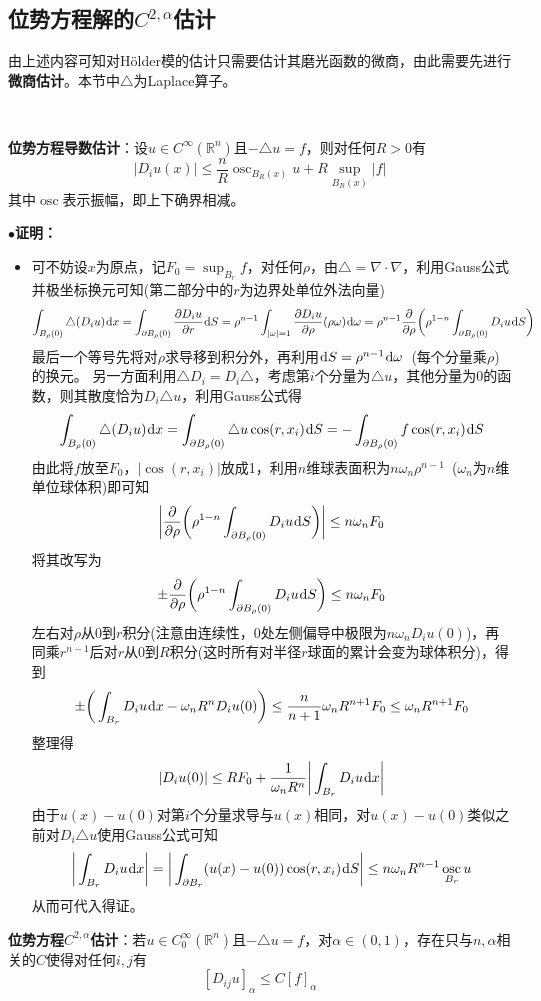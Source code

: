 \documentclass[a4paper,UTF8,fontset=windows,AutoFakeBold]{ctexart}
\newcommand*{\dr}{\hspace{0.07em}\mathrm{d}}
\DeclareMathOperator*{\osc}{osc}
\newcommand{\proo}[1]{{\kaishu $\bullet$\textbf{证明：}
\begin{itemize}
    \item[] #1
\end{itemize}
}}
\begin{document}
\subsection{位势方程解的$C^{2,\alpha}$估计}
由上述内容可知对H\"older模的估计只需要估计其磨光函数的微商，由此需要先进行\textbf{微商估计}。本节中$\triangle$为Laplace算子。

\

\textbf{位势方程导数估计}：设$u\in C^\infty(\mathbb{R}^n)$且$-\triangle u=f$，则对任何$R>0$有
$$|D_iu(x)|\le\frac{n}{R}\osc_{B_R(x)}u+R\sup_{B_R(x)}|f|$$
其中$\osc$表示振幅，即上下确界相减。

\proo{
    可不妨设$x$为原点，记$F_0=\sup_{B_r}f$，对任何$\rho$，由$\triangle=\nabla\cdot\nabla$，利用Gauss公式并极坐标换元可知(第二部分中的$r$为边界处单位外法向量)
    $$\int_{B_\rho(0)}\triangle(D_iu)\dr x=\int_{\partial B_\rho(0)}\frac{\partial D_iu}{\partial r}\dr S=\rho^{n-1}\int_{|\omega|=1}\frac{\partial D_iu}{\partial\rho}(\rho\omega)\dr\omega=\rho^{n-1}\frac{\partial}{\partial\rho}\bigg(\rho^{1-n}\int_{\partial B_\rho(0)}D_iu\dr S\bigg)$$
    最后一个等号先将对$\rho$求导移到积分外，再利用$\dr S=\rho^{n-1}\dr\omega$\ (每个分量乘$\rho$)的换元。
    另一方面利用$\triangle D_i=D_i\triangle$，考虑第$i$个分量为$\triangle u$，其他分量为0的函数，则其散度恰为$D_i\triangle u$，利用Gauss公式得
    $$\int_{B_\rho(0)}\triangle(D_iu)\dr x=\int_{\partial B_\rho(0)}\triangle u\cos(r,x_i)\dr S=-\int_{\partial B_\rho(0)}f\cos(r,x_i)\dr S$$
    由此将$f$放至$F_0$，$|\cos(r,x_i)|$放成1，利用$n$维球表面积为$n\omega_n\rho^{n-1}$\ ($\omega_n$为$n$维单位球体积)即可知
    $$\bigg|\frac{\partial}{\partial\rho}\bigg(\rho^{1-n}\int_{\partial B_\rho(0)}D_iu\dr S\bigg)\bigg|\le n\omega_n F_0$$
    将其改写为
    $$\pm\frac{\partial}{\partial\rho}\bigg(\rho^{1-n}\int_{\partial B_\rho(0)}D_iu\dr S\bigg)\le n\omega_n F_0$$
    左右对$\rho$从0到$r$积分(注意由连续性，0处左侧偏导中极限为$n\omega_nD_iu(0)$)，再同乘$r^{n-1}$后对$r$从0到$R$积分(这时所有对半径$r$球面的累计会变为球体积分)，得到
    $$\pm\bigg(\int_{B_r}D_iu\dr x-\omega_nR^nD_iu(0)\bigg)\le\frac{n}{n+1}\omega_nR^{n+1}F_0\le\omega_nR^{n+1}F_0$$
    整理得
    $$|D_iu(0)|\le RF_0+\frac{1}{\omega_nR^n}\bigg|\int_{B_r}D_iu\dr x\bigg|$$
    由于$u(x)-u(0)$对第$i$个分量求导与$u(x)$相同，对$u(x)-u(0)$类似之前对$D_i\triangle u$使用Gauss公式可知
    $$\bigg|\int_{B_r}D_iu\dr x\bigg|=\bigg|\int_{\partial B_r}(u(x)-u(0))\cos(r,x_i)\dr S\bigg|\le n\omega_nR^{n-1}\osc_{B_r}u$$
    从而可代入得证。
}

\textbf{位势方程$C^{2,\alpha}$估计}：若$u\in C_0^\infty(\mathbb{R}^n)$且$-\triangle u=f$，对$\alpha\in(0,1)$，存在只与$n,\alpha$相关的$C$使得对任何$i,j$有
$$[D_{ij}u]_\alpha\le C[f]_\alpha$$
\end{document}
